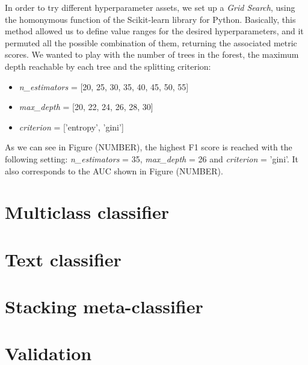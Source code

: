 In order to try different hyperparameter assets, we set up a \textit{Grid Search}, using the homonymous function of the Scikit-learn library for Python.
Basically, this method allowed us to define value ranges for the desired hyperparameters, and it permuted all the possible combination of them, returning the associated metric scores.
We wanted to play with the number of trees in the forest, the maximum depth reachable by each tree and the splitting criterion:
\begin{itemize}
	\item[\PencilRight] \textit{n\_estimators} = [20, 25, 30, 35, 40, 45, 50, 55]
	\item[\PencilRight]\textit{max\_depth} = [20, 22, 24, 26, 28, 30]
	\item[\PencilRight]\textit{criterion} = ['entropy', 'gini']
\end{itemize}
As we can see in Figure (NUMBER), the highest F1 score is reached with the following setting:\textit{ n\_estimators} = 35, \textit{max\_depth} = 26 and \textit{criterion} = 'gini'.
It also corresponds to the AUC shown in Figure (NUMBER).


\section{Multiclass classifier}
\section{Text classifier}
\section{Stacking meta-classifier}
\section{Validation}